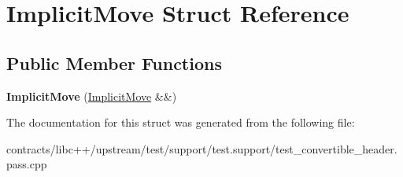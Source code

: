 \hypertarget{struct_implicit_move}{}\section{Implicit\+Move Struct Reference}
\label{struct_implicit_move}
\subsection*{Public Member Functions}
\begin{DoxyCompactItemize}
\item 
\mbox{\label{struct_implicit_move_af638dac2c8059be6460662b78f72782c}} 
{\bfseries Implicit\+Move} (\mbox{\hyperlink{struct_implicit_move}{Implicit\+Move}} \&\&)
\end{DoxyCompactItemize}


The documentation for this struct was generated from the following file\+:\begin{DoxyCompactItemize}
\item 
contracts/libc++/upstream/test/support/test.\+support/test\+\_\+convertible\+\_\+header.\+pass.\+cpp\end{DoxyCompactItemize}
